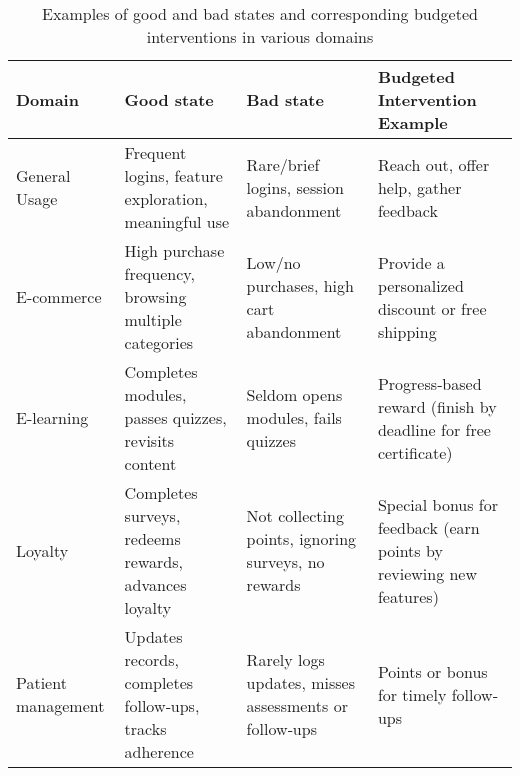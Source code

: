 \begin{table*}[!th]
\centering
\renewcommand{\arraystretch}{1.2} %
\caption{Examples of good and bad states and corresponding budgeted interventions in various domains}
\label{tab:fixedwidth}
\vspace{5pt}
{
\begin{tabular}{
K{0.105\textwidth} 
K{0.26\textwidth} 
K{0.25\textwidth} 
K{0.28\textwidth}
}
\hline
\textbf{Domain} & \textbf{Good state} & \textbf{Bad state} & \textbf{Budgeted Intervention Example} \\
\hline

General Usage & 
Frequent logins, feature exploration, meaningful use & 
Rare/brief logins, session abandonment & 
Reach out, offer help, gather feedback \\

E-commerce & 
High purchase frequency, browsing multiple categories & 
Low/no purchases, high cart abandonment & 
Provide a personalized discount or free shipping \\

E-learning & 
Completes modules, passes quizzes, revisits content & 
Seldom opens modules, fails quizzes & 
Progress‐based reward (finish by deadline for free certificate) \\

Loyalty & 
Completes surveys, redeems rewards, advances loyalty & 
Not collecting points, ignoring surveys, no rewards & 
Special bonus for feedback (earn points by reviewing new features) \\

Patient management & 
Updates records, completes follow‐ups, tracks adherence & 
Rarely logs updates, misses assessments or follow‐ups & 
Points or bonus for timely follow‐ups \\

\hline
\end{tabular}}
\label{tab:examples}
\end{table*}

